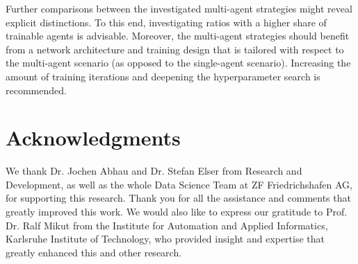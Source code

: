 \documentclass{article}
\begin{document}
Further comparisons between the investigated multi-agent strategies might reveal explicit distinctions. To this end, investigating ratios with a higher share of trainable agents is advisable. Moreover, the multi-agent strategies should benefit from a network architecture and training design that is tailored with respect to the multi-agent scenario (as opposed to the single-agent scenario). Increasing the amount of training iterations and deepening the hyperparameter search is recommended.            

\section*{Acknowledgments}

We thank Dr. Jochen Abhau and Dr. Stefan Elser from Research and Development,  as well as the whole Data Science Team at ZF Friedrichshafen AG, for supporting this research. Thank you for all the assistance and comments that greatly improved this work. We would also like to express our gratitude to Prof. Dr. Ralf Mikut from the Institute for Automation and Applied Informatics, Karlsruhe Institute of Technology, who provided insight and expertise that greatly enhanced this and other research.



\end{document}
